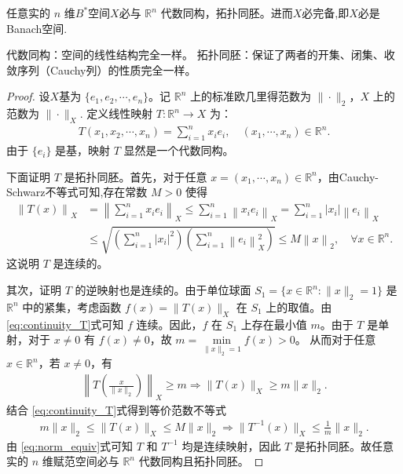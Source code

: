 \documentclass[../../main.tex]{subfiles}%
\begin{document}
\begin{proposition}\label{proposition:有限维实赋范线性空间都与Rn代数同构拓扑同胚}
任意实的 \(n\) 维$B^*$空间$X$必与 \(\mathbb{R}^n\) 代数同构，拓扑同胚。进而$X$必完备,即$X$必是Banach空间.
\end{proposition}
\begin{remark}
代数同构：空间的线性结构完全一样。
拓扑同胚：保证了两者的开集、闭集、收敛序列（Cauchy列）的性质完全一样。
\end{remark}
\begin{proof}

设$X$基为 \(\{e_1, e_2, \cdots, e_n\}\)。记 \(\mathbb{R}^n\) 上的标准欧几里得范数为 \(\|\cdot\|_2\)，\(X\) 上的范数为 \(\|\cdot\|_X\).
定义线性映射 \(T: \mathbb{R}^n \to X\) 为：
\begin{align}
T(x_1, x_2, \cdots, x_n) = \sum\limits_{i=1}^{n} x_i e_i, \quad (x_1, \cdots, x_n) \in \mathbb{R}^n. \label{eq:map_T}
\end{align}
由于 \(\{e_i\}\) 是基，映射 \(T\) 显然是一个代数同构。

下面证明 \(T\) 是拓扑同胚。首先，对于任意 \(x = (x_1, \cdots, x_n) \in \mathbb{R}^n\)，由Cauchy-Schwarz不等式可知,存在常数 \(M > 0\) 使得
\begin{align}
\left\| T\left( x \right) \right\| _X&=\left\| \sum_{i=1}^n{x_ie_i} \right\| _X\leqslant \sum_{i=1}^n{\left\| x_ie_i \right\| _X}=\sum_{i=1}^n{\left| x_i \right|}\left\| e_i \right\| _X
\\
&\leqslant \sqrt{\left( \sum_{i=1}^n{\left| x_i \right|^2} \right) \left( \sum_{i=1}^n{\left\| e_i \right\| _{X}^{2}} \right)}\leqslant M\left\| x \right\| _2,\quad \forall x\in \mathbb{R} ^n.\label{eq:continuity_T}
\end{align}
这说明 \(T\) 是连续的。

其次，证明 \(T\) 的逆映射也是连续的。由于单位球面 \(S_1 = \{x \in \mathbb{R}^n : \|x\|_2 = 1\}\) 是 \(\mathbb{R}^n\) 中的紧集，考虑函数 \(f(x) = \|T(x)\|_X\) 在 \(S_1\) 上的取值。由 \eqref{eq:continuity_T}式可知 \(f\) 连续。因此，\(f\) 在 \(S_1\) 上存在最小值 \(m\)。由于 \(T\) 是单射，对于 \(x \neq 0\) 有 \(f(x) \neq 0\)，故 \(m = \min\limits_{\|x\|_2 = 1} f(x) > 0\)。
从而对于任意 \(x \in \mathbb{R}^n\)，若 \(x \neq 0\)，有
\begin{align*}
\left\| T \left( \frac{x}{\|x\|_2} \right) \right\|_X \geqslant m \Longrightarrow \|T(x)\|_X \geqslant m \|x\|_2.
\end{align*}
结合 \eqref{eq:continuity_T}式得到等价范数不等式
\begin{align}
m \|x\|_2 \leqslant \|T(x)\|_X \leqslant M \|x\|_2\Longrightarrow \|T^{-1}(x)\|_X\leqslant \frac{1}{m}\|x\|_2. \label{eq:norm_equiv}
\end{align}
由 \eqref{eq:norm_equiv}式可知 \(T\) 和 \(T^{-1}\) 均是连续映射，因此 \(T\) 是拓扑同胚。故任意实的 \(n\) 维赋范空间必与 \(\mathbb{R}^n\) 代数同构且拓扑同胚。
\end{proof}
\end{document}
